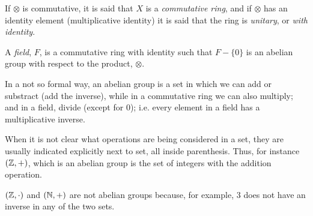 \begin{note}
    If $\otimes$ is commutative, it is said that $X$ is a \textit{commutative ring}, and if $\otimes$ has an
    identity element (multiplicative identity) it is said that the ring is \textit{unitary}, or \textit{with
    identity}.
\end{note}

\begin{defi}[Field]
    A \textit{field}, $F$, is a commutative ring with identity such that $F - \{0\}$ is an
    abelian group with respect to the product, $\otimes$.
\end{defi}

In a not so formal way, an abelian group is a set in which we can add or substract (add the inverse),
while in a commutative ring we can also multiply; and in a field, divide (except for $0$); i.e. every
element in a field has a multiplicative inverse.

When it is not clear what operations are being considered in a set, they are usually indicated explicitly
next to set, all inside parenthesis. Thus, for instance $\left( \mathbb{Z}, + \right) $, which is an abelian group
is the set of integers with the addition operation.

\begin{example}
    $\left( \mathbb{Z}, \cdot \right) $ and $\left( \mathbb{N}, + \right) $ are not abelian groups because, for example,
    3 does not have an inverse in any of the two sets.
\end{example}

